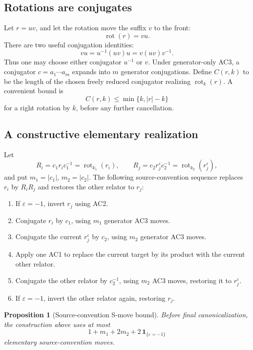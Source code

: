 \documentclass[11pt]{article}
\newtheorem{proposition}[theorem]{Proposition}
\theoremstyle{definition}
\theoremstyle{remark}
\newcommand{\rot}{\operatorname{rot}}
\newcommand{\len}[1]{\left|#1\right|}
\newcommand{\eps}{\varepsilon}
\begin{document}
\subsection{Rotations are conjugates}

Let \(r=uv\), and let the rotation move the suffix \(v\) to the front:
\[
  \rot(r)=vu.
\]
There are two useful conjugation identities:
\[
  vu=u^{-1}(uv)u=v(uv)v^{-1}.
\]
Thus one may choose either conjugator \(u^{-1}\) or \(v\).  Under
generator-only AC3, a conjugator \(c=a_1\cdots a_m\) expands into \(m\)
generator conjugations.  Define \(C(r,k)\) to be the length of the chosen
freely reduced conjugator realizing \(\rot_k(r)\).  A convenient bound is
\[
  C(r,k)\le\min\{k,\len{r}-k\}
\]
for a right rotation by \(k\), before any further cancellation.

\subsection{A constructive elementary realization}

Let
\[
R_i=c_1r_ic_1^{-1}=\rot_{k_1}(r_i),\qquad
R_j=c_2r_j^\eps c_2^{-1}=\rot_{k_2}(r_j^\eps),
\]
and put \(m_1=\len{c_1}\), \(m_2=\len{c_2}\).
The following source-convention sequence replaces \(r_i\) by \(R_iR_j\)
and restores the other relator to \(r_j\):

\begin{enumerate}
  \item If \(\eps=-1\), invert \(r_j\) using AC2.
  \item Conjugate \(r_i\) by \(c_1\), using \(m_1\) generator AC3 moves.
  \item Conjugate the current \(r_j^\eps\) by \(c_2\), using \(m_2\)
  generator AC3 moves.
  \item Apply one AC1 to replace the current target by its product with
  the current other relator.
  \item Conjugate the other relator by \(c_2^{-1}\), using \(m_2\) AC3
  moves, restoring it to \(r_j^\eps\).
  \item If \(\eps=-1\), invert the other relator again, restoring \(r_j\).
\end{enumerate}

\begin{proposition}[Source-convention S-move bound]
\label{prop:smove-bound}
Before final canonicalization, the construction above uses at most
\[
  \boxed{
  1+m_1+2m_2+2\,\mathbf 1_{\{\eps=-1\}}
  }
\]
elementary source-convention moves.
\end{proposition}
\end{document}
